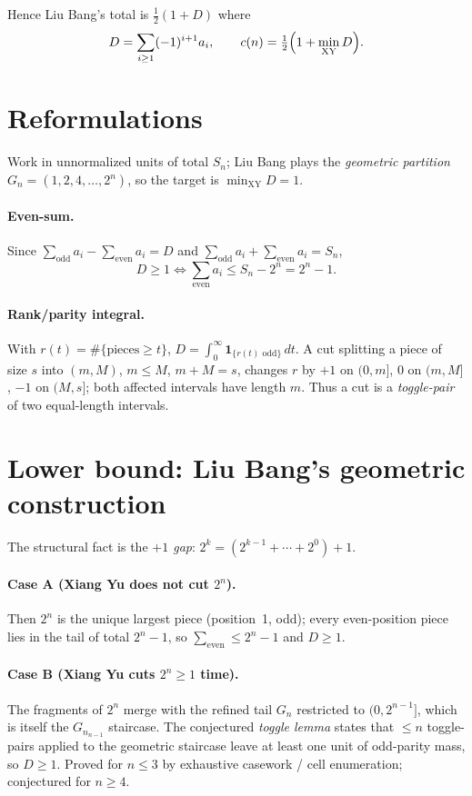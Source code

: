 \documentclass[11pt]{article}
\theoremstyle{remark}\newtheorem*{remark}{Remark}
\newcommand{\Sn}{S_{n}}
\newcommand{\Gn}{G_{n}}
\begin{document}
Hence Liu Bang's total is $\tfrac12(1+D)$ where
\[
D=\sum_{i\ge1}(-1)^{i+1}a_i,\qquad
c(n)=\tfrac12\Bigl(1+\min_{\text{XY}}D\Bigr).
\]

\section{Reformulations}

Work in unnormalized units of total $\Sn$; Liu Bang plays the \emph{geometric
partition} $\Gn=(1,2,4,\ldots,2^n)$, so the target is $\min_{\text{XY}}D=1$.

\paragraph{Even-sum.}
Since $\sum_{\text{odd}}a_i-\sum_{\text{even}}a_i=D$ and
$\sum_{\text{odd}}a_i+\sum_{\text{even}}a_i=\Sn$,
\[
D\ge1\iff \textstyle\sum_{\text{even}}a_i\le \Sn-2^n=2^n-1.
\]

\paragraph{Rank/parity integral.}
With $r(t)=\#\{\text{pieces}\ge t\}$, $D=\int_0^\infty \mathbf 1_{\{r(t)\text{ odd}\}}\,dt$.
A cut splitting a piece of size $s$ into $(m,M)$, $m\le M$, $m+M=s$, changes $r$ by
$+1$ on $(0,m]$, $0$ on $(m,M]$, $-1$ on $(M,s]$; both affected intervals have length
$m$. Thus a cut is a \emph{toggle-pair} of two equal-length intervals.

\section{Lower bound: Liu Bang's geometric construction}

The structural fact is the \emph{$+1$ gap}: $2^k=(2^{k-1}+\cdots+2^0)+1$.

\paragraph{Case A (Xiang Yu does not cut $2^n$).}
Then $2^n$ is the unique largest piece (position~1, odd); every even-position piece
lies in the tail of total $2^n-1$, so $\sum_{\text{even}}\le2^n-1$ and $D\ge1$.

\paragraph{Case B (Xiang Yu cuts $2^n\ge1$ time).}
The fragments of $2^n$ merge with the refined tail $\Gn$ restricted to
$(0,2^{n-1}]$, which is itself the $\Gn_{n-1}$ staircase. The conjectured
\emph{toggle lemma} states that $\le n$ toggle-pairs applied to the geometric
staircase leave at least one unit of odd-parity mass, so $D\ge1$.
Proved for $n\le3$ by exhaustive casework / cell enumeration; conjectured for
$n\ge4$.
\end{document}
